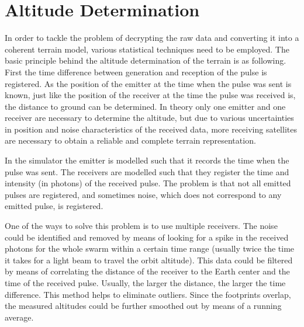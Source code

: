 \section{Altitude Determination}
\label{altDet}
In order to tackle the problem of decrypting the raw data and converting it into a coherent terrain model, various statistical techniques need to be employed. The basic principle behind the altitude determination of the terrain is as following. First the time difference between generation and reception of the pulse is registered. As the position of the emitter at the time when the pulse was sent is known, just like the position of the receiver at the time the pulse was received is, the distance to ground can be determined. In theory only one emitter and one receiver are necessary to determine the altitude, but due to various uncertainties in position and noise characteristics of the received data, more receiving satellites are necessary to obtain a reliable and complete terrain representation. 

In the simulator the emitter is modelled such that it records the time when the pulse was sent. The receivers are modelled such that they register the time and intensity (in photons) of the received pulse. The problem is that not all emitted pulses are registered, and sometimes noise, which does not correspond to any emitted pulse, is registered.

One of the ways to solve this problem is to use multiple receivers. The noise could be identified and removed by means of looking for a spike in the received photons for the whole swarm within a certain time range (usually twice the time it takes for a light beam to travel the orbit altitude). This data could be filtered by means of correlating the distance of the receiver to the Earth center and the time of the received pulse. Usually, the larger the distance, the larger the time difference. This method helps to eliminate outliers.
Since the footprints overlap, the measured altitudes could be further smoothed out by means of a running average. 
